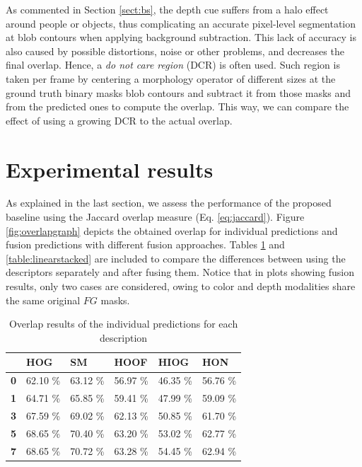 \documentclass[10pt,twocolumn,letterpaper]{article}
\begin{document}
As commented in Section \ref{sect:bs}, the depth cue suffers from a halo effect around people or objects, thus complicating an accurate pixel-level segmentation at blob contours when applying background subtraction. This lack of accuracy is also caused by possible distortions, noise or other problems, and decreases the final overlap. Hence, a \emph{do not care region} (DCR) is often used. Such region is taken per frame by centering a morphology operator of different sizes at the ground truth binary masks blob contours and subtract it from those masks and from the predicted ones to compute the overlap. This way, we can compare the effect of using a growing DCR to the actual overlap.

\section{Experimental results}
\label{ssec:experimentalresults}

As explained in the last section, we assess the performance of the proposed baseline using the Jaccard overlap measure (Eq. \ref{eq:jaccard}). Figure \ref{fig:overlapgraph} depicts the obtained overlap for individual predictions and fusion predictions with different fusion approaches. Tables \ref{table:individual} and \ref{table:linearstacked} are included to compare the differences between using the descriptors separately and after fusing them. Notice that in plots showing fusion results, only two cases are considered, owing to color and depth modalities share the same original $FG$ masks.

\begin{table}[h]\footnotesize
\center
\caption{Overlap results of the individual predictions for each description}
\label{table:individual}
\begin{tabular}{|l|l|l|l|l|l|}
\hline
&\textbf{HOG}&\textbf{SM}&\textbf{HOOF}&\textbf{HIOG}&\textbf{HON}\\\hline
\textbf{0}&62.10 \% &63.12 \%&56.97 \%&46.35 \%&56.76 \%\\\hline
\textbf{1}&64.71 \%&65.85 \%&59.41 \%&47.99 \%&59.09 \%\\\hline
\textbf{3}&67.59 \%&69.02 \%&62.13 \%&50.85 \%&61.70 \%\\\hline
\textbf{5}&68.65 \%&70.40 \%&63.20 \%&53.02 \%&62.77 \%\\\hline
\textbf{7}&68.65 \%&70.72 \%&63.28 \%&54.45 \%&62.94 \%\\\hline
\end{tabular}
\end{table}
\end{document}

